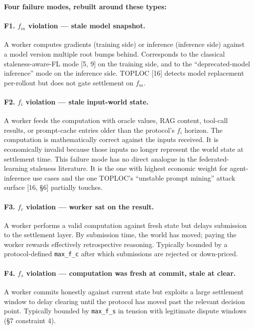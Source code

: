 \documentclass[11pt]{article}
\begin{document}
\textbf{Four failure modes, rebuilt around these types:}

\paragraph{F1. $f_m$ violation --- stale model snapshot.} A worker computes gradients (training side) or inference (inference side) against a model version multiple root bumps behind. Corresponds to the classical staleness-aware-FL mode [5, 9] on the training side, and to the ``deprecated-model inference'' mode on the inference side. TOPLOC [16] detects model replacement per-rollout but does not gate settlement on $f_m$.

\paragraph{F2. $f_i$ violation --- stale input-world state.} A worker feeds the computation with oracle values, RAG content, tool-call results, or prompt-cache entries older than the protocol's $f_i$ horizon. The computation is mathematically correct against the inputs received. It is economically invalid because those inputs no longer represent the world state at settlement time. This failure mode has no direct analogue in the federated-learning staleness literature. It is the one with highest economic weight for agent-inference use cases and the one TOPLOC's ``unstable prompt mining'' attack surface [16, \S6] partially touches.

\paragraph{F3. $f_c$ violation --- worker sat on the result.} A worker performs a valid computation against fresh state but delays submission to the settlement layer. By submission time, the world has moved; paying the worker rewards effectively retrospective reasoning. Typically bounded by a protocol-defined \texttt{max\_f\_c} after which submissions are rejected or down-priced.

\paragraph{F4. $f_s$ violation --- computation was fresh at commit, stale at clear.} A worker commits honestly against current state but exploits a large settlement window to delay clearing until the protocol has moved past the relevant decision point. Typically bounded by \texttt{max\_f\_s} in tension with legitimate dispute windows (\S7 constraint 4).
\end{document}

